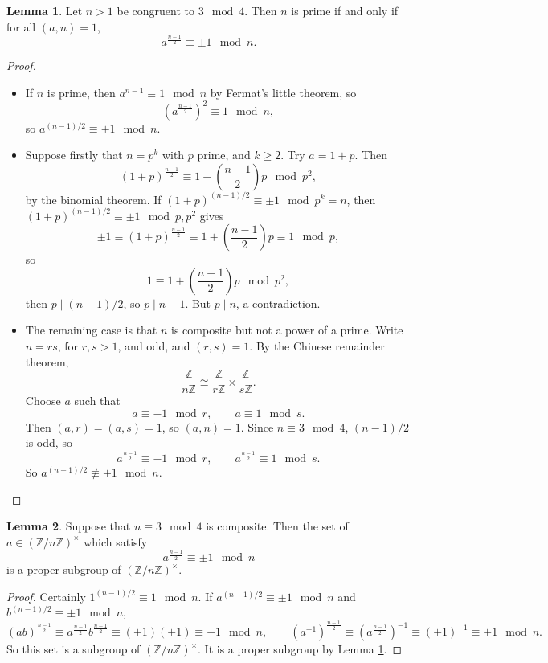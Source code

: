 \documentclass{article}
\newcommand{\Z}{\mathbb{Z}}
\newcommand{\rb}[1]{\left( #1 \right)}
\newcommand{\unit}[1]{\rb{\Z / #1\Z}^\times}
\theoremstyle{definition}\newtheorem{definition}{Definition}
\theoremstyle{definition}\newtheorem{remark}[definition]{Remark}
\theoremstyle{definition}\newtheorem*{example}{Example}
\theoremstyle{definition}\newtheorem*{note}{Note}
\newtheorem{lemma}[definition]{Lemma}
\begin{document}
\begin{lemma}
\label{lem:30}
Let $ n > 1 $ be congruent to $ 3 \mod 4 $. Then $ n $ is prime if and only if for all $ \rb{a, n} = 1 $,
$$ a^{\tfrac{n - 1}{2}} \equiv \pm 1 \mod n. $$
\end{lemma}

\begin{proof}
\hfill
\begin{itemize}
\item If $ n $ is prime, then $ a^{n - 1} \equiv 1 \mod n $ by Fermat's little theorem, so
$$ \rb{a^{\tfrac{n - 1}{2}}}^2 \equiv 1 \mod n, $$
so $ a^{\rb{n - 1} / 2} \equiv \pm 1 \mod n $.
\item Suppose firstly that $ n = p^k $ with $ p $ prime, and $ k \ge 2 $. Try $ a = 1 + p $. Then
$$ \rb{1 + p}^{\tfrac{n - 1}{2}} \equiv 1 + \rb{\dfrac{n - 1}{2}}p \mod p^2, $$
by the binomial theorem. If $ \rb{1 + p}^{\rb{n - 1} / 2} \equiv \pm 1 \mod p^k = n $, then $ \rb{1 + p}^{\rb{n - 1} / 2} \equiv \pm 1 \mod p, p^2 $ gives
$$ \pm 1 \equiv \rb{1 + p}^{\tfrac{n - 1}{2}} \equiv 1 + \rb{\dfrac{n - 1}{2}}p \equiv 1 \mod p, $$
so
$$ 1 \equiv 1 + \rb{\dfrac{n - 1}{2}}p \mod p^2, $$
then $ p \mid \rb{n - 1} / 2 $, so $ p \mid n - 1 $. But $ p \mid n $, a contradiction.
\item The remaining case is that $ n $ is composite but not a power of a prime. Write $ n = rs $, for $ r, s > 1 $, and odd, and $ \rb{r, s} = 1 $. By the Chinese remainder theorem,
$$ \dfrac{\Z}{n\Z} \cong \dfrac{\Z}{r\Z} \times \dfrac{\Z}{s\Z}. $$
Choose $ a $ such that
$$ a \equiv -1 \mod r, \qquad a \equiv 1 \mod s. $$
Then $ \rb{a, r} = \rb{a, s} = 1 $, so $ \rb{a, n} = 1 $. Since $ n \equiv 3 \mod 4 $, $ \rb{n - 1} / 2 $ is odd, so
$$ a^{\tfrac{n - 1}{2}} \equiv -1 \mod r, \qquad a^{\tfrac{n - 1}{2}} \equiv 1 \mod s. $$
So $ a^{\rb{n - 1} / 2} \not\equiv \pm 1 \mod n $.
\end{itemize}
\end{proof}

\begin{lemma}
\label{lem:31}
Suppose that $ n \equiv 3 \mod 4 $ is composite. Then the set of $ a \in \unit{n} $ which satisfy
$$ a^{\tfrac{n - 1}{2}} \equiv \pm 1 \mod n $$
is a proper subgroup of $ \unit{n} $.
\end{lemma}

\begin{proof}
Certainly $ 1^{\rb{n - 1} / 2} \equiv 1 \mod n $. If $ a^{\rb{n - 1} / 2} \equiv \pm 1 \mod n $ and $ b^{\rb{n - 1} / 2} \equiv \pm 1 \mod n $,
$$ \rb{ab}^{\tfrac{n - 1}{2}} \equiv a^{\tfrac{n - 1}{2}}b^{\tfrac{n - 1}{2}} \equiv \rb{\pm 1}\rb{\pm 1} \equiv \pm 1 \mod n, \qquad \rb{a^{-1}}^{\tfrac{n - 1}{2}} \equiv \rb{a^{\tfrac{n - 1}{2}}}^{-1} \equiv \rb{\pm 1}^{-1} \equiv \pm 1 \mod n. $$
So this set is a subgroup of $ \unit{n} $. It is a proper subgroup by Lemma \ref{lem:30}.
\end{proof}
\end{document}
